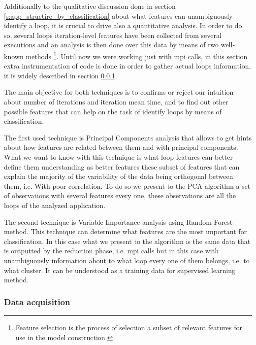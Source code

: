 Additionally to the qualitative discussion done in section
\ref{s:app_structire_by_classification} about what features can unambiguously
identify a loop, it is crucial to drive also a 
quantitative analysis. In order to do so, several loops iteration-level 
features have been collected from several executions and an analysis
is then done over this data by means of two well-known methods 
\footnote{Feature selection is the process of selection a subset of relevant 
features for use in the model construction.}. Until now we were working just
with mpi calls, in this section extra instrumentation of code is done in order
to gather actual loops information, it is widely described in section
\ref{ss:data_acquisition}. 

The main objective for both techniques is to 
confirms or reject our intuition about number of iterations and iteration 
mean time, and to find out other possible features that can help on the task 
of identify loops by means of classification.

The first used technique is Principal Components analysis that allows to get hints 
about how features are related between them and with principal components. What
we want to know with this technique is what loop features can better define
them understanding as better features these subset of features that can explain
the majority of the variability of the data being orthogonal between them, i.e.
With poor correlation. To do so we present to the PCA algorithm a set of
observations with several features every one, these observations are all the loops
of the analyzed application. 

The second technique is 
Variable Importance analysis using Random Forest method. This technique can
determine what features are the most important for classification. 
In this case what we
present to the algorithm is the same data that is outputted by the reduction phase,
i.e. mpi calls but in this case with unambiguously information about to what
loop every one of them belongs, i.e. to what cluster. It can be understood as 
a training data for supervised learning method.   

\subsubsection{Data acquisition}\label{ss:data_acquisition}

